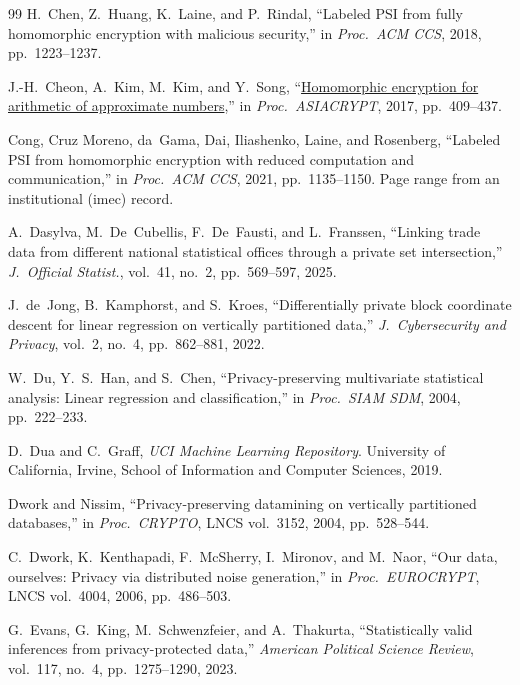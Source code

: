 \documentclass[11pt]{article}
\theoremstyle{definition}
\theoremstyle{plain}
\begin{document}
\begin{thebibliography}{99}
H.~Chen, Z.~Huang, K.~Laine, and P.~Rindal,
``Labeled PSI from fully homomorphic encryption with malicious security,''
in \textit{Proc.\ ACM CCS}, 2018, pp.\ 1223--1237.

J.-H.~Cheon, A.~Kim, M.~Kim, and Y.~Song,
``\href{https://doi.org/10.1007/978-3-319-70694-8_15}{Homomorphic encryption for arithmetic of approximate numbers},''
in \textit{Proc.\ ASIACRYPT}, 2017, pp.\ 409--437.

Cong, Cruz Moreno, da~Gama, Dai, Iliashenko, Laine, and Rosenberg,
``Labeled PSI from homomorphic encryption with reduced computation and communication,''
in \textit{Proc.\ ACM CCS}, 2021, pp.\ 1135--1150. Page range from an institutional (imec) record.

A.~Dasylva, M.~De~Cubellis, F.~De~Fausti, and L.~Franssen,
``Linking trade data from different national statistical offices through a private set intersection,''
\textit{J.\ Official Statist.}, vol.~41, no.~2, pp.\ 569--597, 2025.

J.~de~Jong, B.~Kamphorst, and S.~Kroes,
``Differentially private block coordinate descent for linear regression on vertically partitioned data,''
\textit{J.\ Cybersecurity and Privacy}, vol.~2, no.~4, pp.\ 862--881, 2022.

W.~Du, Y.~S.~Han, and S.~Chen,
``Privacy-preserving multivariate statistical analysis: Linear regression and classification,''
in \textit{Proc.\ SIAM SDM}, 2004, pp.\ 222--233.

D.~Dua and C.~Graff,
\textit{UCI Machine Learning Repository}.
University of California, Irvine, School of Information and Computer Sciences, 2019.

Dwork and Nissim,
``Privacy-preserving datamining on vertically partitioned databases,''
in \textit{Proc.\ CRYPTO}, LNCS vol.~3152, 2004, pp.\ 528--544.

C.~Dwork, K.~Kenthapadi, F.~McSherry, I.~Mironov, and M.~Naor,
``Our data, ourselves: Privacy via distributed noise generation,''
in \textit{Proc.\ EUROCRYPT}, LNCS vol.~4004, 2006, pp.\ 486--503.

G.~Evans, G.~King, M.~Schwenzfeier, and A.~Thakurta,
``Statistically valid inferences from privacy-protected data,''
\textit{American Political Science Review}, vol.~117, no.~4, pp.\ 1275--1290, 2023.


\end{thebibliography}
\end{document}
